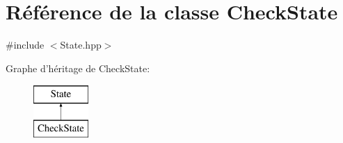 \hypertarget{class_check_state}{\section{Référence de la classe Check\-State}
\label{class_check_state}
}


{\ttfamily \#include $<$State.\-hpp$>$}

Graphe d'héritage de Check\-State\-:\begin{figure}[H]
\begin{center}
\leavevmode
\includegraphics[height=2.000000cm]{class_check_state}
\end{center}
\end{figure}
